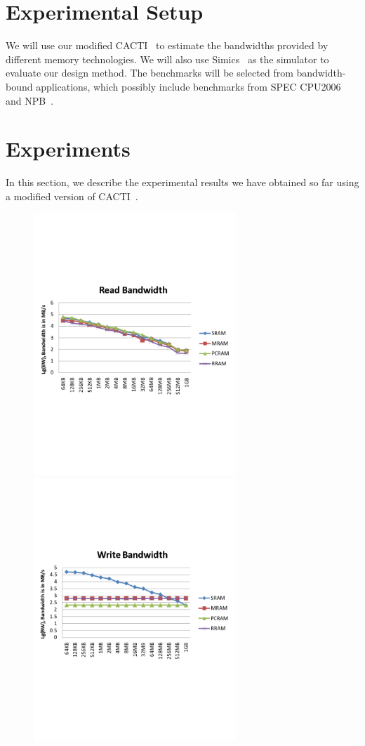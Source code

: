 \documentclass[12pt,letterpaper, singlecolumn]{article}
\begin{document}
\begin{large}
\section{Experimental Setup}

We will use our modified CACTI~\cite{CACTI} to estimate the bandwidths provided
by different memory technologies. We will also use
Simics~\cite{Magnusson:2002:simics-orig-paper} as the simulator to evaluate our
design method. The benchmarks will be selected from bandwidth-bound
applications, which possibly include benchmarks from SPEC
CPU2006~\cite{SPEC:2006} and NPB~\cite{NPB}.\vspace{0.15in}

\section{Experiments}

In this section, we describe the experimental results we have obtained so far
using a modified version of CACTI~\cite{CACTI}. \vspace{-0.5in}

\begin{figure}[htbp]
\centering
\includegraphics[width=3in]{figures/read-bw}
\includegraphics[width=3in]{figures/write-bw}\\


\end{figure}
\end{large}
\end{document}

